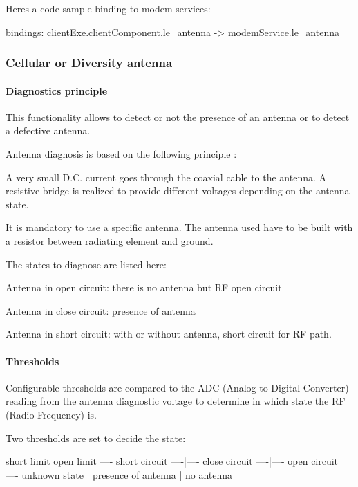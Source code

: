 Here\textquotesingle{}s a code sample binding to modem services\+: \begin{DoxyVerb}  bindings:
  {
     clientExe.clientComponent.le_antenna -> modemService.le_antenna
  }\end{DoxyVerb}
\hypertarget{c_antenna_le_antenna_cell_section}{}\subsubsection{Cellular or Diversity antenna}\label{c_antenna_le_antenna_cell_section}
\hypertarget{c_antenna_le_antenna_cell_diag_subsection}{}\paragraph{Diagnostics principle}\label{c_antenna_le_antenna_cell_diag_subsection}
This functionality allows to detect or not the presence of an antenna or to detect a defective antenna.

Antenna diagnosis is based on the following principle \+:

A very small D.\+C. current goes through the coaxial cable to the antenna. A resistive bridge is realized to provide different voltages depending on the antenna state.

It is mandatory to use a specific antenna. The antenna used have to be built with a resistor between radiating element and ground.

The states to diagnose are listed here\+:
\begin{DoxyItemize}
\item Antenna in open circuit\+: there is no antenna but R\+F open circuit
\item Antenna in close circuit\+: presence of antenna
\item Antenna in short circuit\+: with or without antenna, short circuit for R\+F path.
\end{DoxyItemize}\hypertarget{c_antenna_le_antenna_cell_thres_subsection}{}\paragraph{Thresholds}\label{c_antenna_le_antenna_cell_thres_subsection}
Configurable thresholds are compared to the A\+D\+C (Analog to Digital Converter) reading from the antenna diagnostic voltage to determine in which state the R\+F (Radio Frequency) is.

Two thresholds are set to decide the state\+: \begin{DoxyVerb}                          short limit                   open limit
  ---- short circuit ----|---- close circuit ----|---- open circuit ----
         unknown state      |   presence of antenna  |        no antenna
\end{DoxyVerb}


